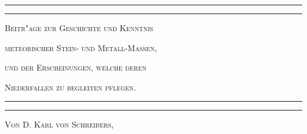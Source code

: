 \documentclass[a4paper, 11pt, oneside, german]{article}
\begin{document}
\begin{titlepage} %
	\centering %

	
	\rule{\textwidth}{1.6pt}\vspace*{-\baselineskip}\vspace*{2pt} %
	\rule{\textwidth}{0.4pt} %
	
	\vspace{1.5\baselineskip} %
	
	{\scshape\LARGE Beitr"age zur Geschichte und Kenntnis }
	
	\vspace{1\baselineskip} %

	{\scshape\LARGE meteorischer Stein- und Metall-Massen, }

	\vspace{1\baselineskip} %

 	{\scshape\LARGE und der Erscheinungen, welche deren }

	\vspace{1\baselineskip} %

	{\scshape\LARGE Niederfallen zu begleiten pflegen.}

	\vspace{1.5\baselineskip} %

	\rule{\textwidth}{0.4pt}\vspace*{-\baselineskip}\vspace{3.2pt} %
	\rule{\textwidth}{1.6pt} %
	
	\vspace{1\baselineskip} %
	
	
	{\scshape Von D. Karl von Schreibers,} %
	
	\vspace*{1\baselineskip} %
	

\end{titlepage}
\end{document}
